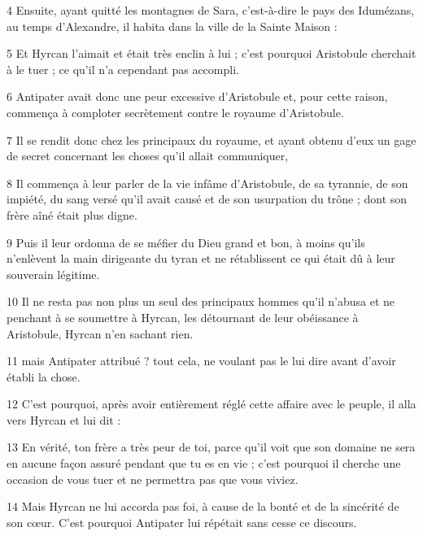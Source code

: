 \par 4 Ensuite, ayant quitté les montagnes de Sara, c'est-à-dire le pays des Idumézans, au temps d'Alexandre, il habita dans la ville de la Sainte Maison :

\par 5 Et Hyrcan l'aimait et était très enclin à lui ; c'est pourquoi Aristobule cherchait à le tuer ; ce qu’il n’a cependant pas accompli.

\par 6 Antipater avait donc une peur excessive d'Aristobule et, pour cette raison, commença à comploter secrètement contre le royaume d'Aristobule.

\par 7 Il se rendit donc chez les principaux du royaume, et ayant obtenu d'eux un gage de secret concernant les choses qu'il allait communiquer,

\par 8 Il commença à leur parler de la vie infâme d'Aristobule, de sa tyrannie, de son impiété, du sang versé qu'il avait causé et de son usurpation du trône ; dont son frère aîné était plus digne.

\par 9 Puis il leur ordonna de se méfier du Dieu grand et bon, à moins qu'ils n'enlèvent la main dirigeante du tyran et ne rétablissent ce qui était dû à leur souverain légitime.

\par 10 Il ne resta pas non plus un seul des principaux hommes qu'il n'abusa et ne penchant à se soumettre à Hyrcan, les détournant de leur obéissance à Aristobule, Hyrcan n'en sachant rien.

\par 11 mais Antipater attribué ? tout cela, ne voulant pas le lui dire avant d'avoir établi la chose.

\par 12 C'est pourquoi, après avoir entièrement réglé cette affaire avec le peuple, il alla vers Hyrcan et lui dit :

\par 13 En vérité, ton frère a très peur de toi, parce qu'il voit que son domaine ne sera en aucune façon assuré pendant que tu es en vie ; c'est pourquoi il cherche une occasion de vous tuer et ne permettra pas que vous viviez.

\par 14 Mais Hyrcan ne lui accorda pas foi, à cause de la bonté et de la sincérité de son cœur. C'est pourquoi Antipater lui répétait sans cesse ce discours.

